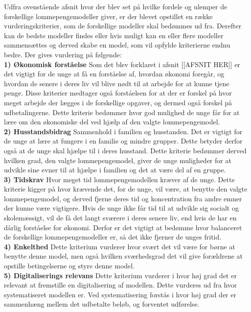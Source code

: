 Udfra ovenstående afsnit hvor der blev set på hvilke fordele og ulemper de forskellige lommepengemodeller giver, er der blevet opstillet en række vurderingskriterier, som de forskellige modeller skal bedømmes ud fra. Derefter kan de bedste modeller findes eller hvis muligt kan en eller flere modeller sammensættes og derved skabe en model, som vil opfylde kriterierne endnu bedre. Der gives vurdering på følgende:\\

\noindent\textbf{1) Økonomisk forståelse}
Som det blev forklaret i afsnit [[AFSNIT HER]] er det vigtigt for de unge at få en forståelse af, hvordan økonomi foregår, og hvordan de senere i deres liv vil blive nødt til at arbejde for at kunne tjene penge. 
Disse kriterier medtager også forståelsen for at der er forskel på hvor meget arbejde der lægges i de forskellige opgaver, og dermed også forskel på udbetalingerne.
Dette kriterie bedømmer hvor god mulighed de unge får for at lære om den økonomiske del ved hjælp af den valgte lommepengemodel.\\

\noindent\textbf{2) Husstandsbidrag}
Sammenhold i familien og husstanden. 
Det er vigtigt for de unge at lære at fungere i en familie og mindre grupper. Dette betyder derfor også at de unge skal hjælpe til i deres husstand.
Dette kriterie bedømmer derved hvilken grad, den valgte lommepengemodel, giver de unge muligheder for at udvikle sine evner til at hjælpe i familien og det at være del af en gruppe.\\

\noindent\textbf{3) Tidskrav}
Hvor meget tid lommepengemodellen kræver af de unge.
Dette kriterie kigger på hvor krævende det, for de unge, vil være, at benytte den valgte lommepengemodel, og derved fjerne deres tid og koncentration fra andre emner der kunne være vigtigere. Hvis de unge ikke får tid til at udvikle sig socialt og skolemæssigt, vil de få det langt sværere i deres senere liv, end hvis de har en dårlig forståelse for økonomi.
Derfor er det vigtigt at bedømme hvor balanceret de forskellige lommepengemodeller er, så det ikke fjerner de unges fritid.\\

\noindent\textbf{4) Enkelthed}
Dette kriterium vurderer hvor svært det vil være for børne at benytte denne model, men også hvilken sværhedsgrad det vil give forældrene at opstille betingelserne og styre denne model.\\

\noindent\textbf{5) Digitaliserings relevans}
Dette kriterium vurderer i hvor høj grad det er relevant at fremstille en digitalisering af modellen. Dette vurderes ud fra hvor systematiseret modellen er. Ved systematisering forstås i hvor høj grad der er sammenhæng mellem det udbetalte beløb, og forventet udførelse. \\%

